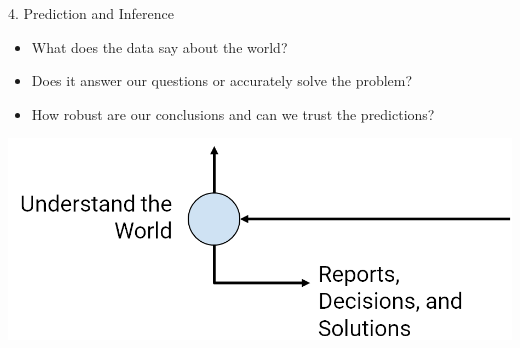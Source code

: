 \documentclass[aspectratio=169]{../latex_main/tntbeamer}  %
\begin{document}
    \begin{frame}{4. Prediction and Inference}
        \begin{itemize}
            \item What does the data say about the world?
            \item Does it answer our questions or accurately solve the problem?
            \item How robust are our conclusions and can we trust the predictions? 
        \end{itemize}
        \hfill
        \includegraphics[scale=.45]{bild20}
    \end{frame}
\end{document}
